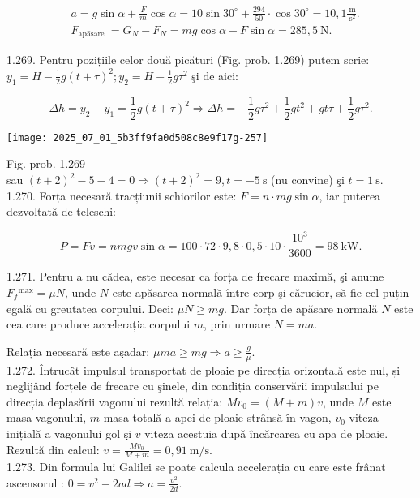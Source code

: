 $$
\begin{aligned}
& a=g \sin \alpha+\frac{F}{m} \cos \alpha=10 \sin 30^{\circ}+\frac{294}{50} \cdot \cos 30^{\circ}=10,1 \frac{\mathrm{~m}}{\mathrm{~s}^{2}} . \\
& F_{\text {apāsare }}=G_{N}-F_{N}=m g \cos \alpha-F \sin \alpha=285,5 \mathrm{~N} .
\end{aligned}
$$

1.269. Pentru pozițiile celor două picături (Fig. prob. 1.269) putem scrie: $y_{1}=H-\frac{1}{2} g(t+\tau)^{2} ; y_{2}=H-\frac{1}{2} g \tau^{2}$ şi de aici:

$$
\Delta h=y_{2}-y_{1}=\frac{1}{2} g(t+\tau)^{2} \Rightarrow \Delta h=-\frac{1}{2} g \tau^{2}+\frac{1}{2} g t^{2}+g t \tau+\frac{1}{2} g \tau^{2} .
$$

\begin{center}
\texttt{[image: 2025\_07\_01\_5b3ff9fa0d508c8e9f17g-257]}
\end{center}

Fig. prob. 1.269\\
sau $(t+2)^{2}-5-4=0 \Rightarrow(t+2)^{2}=9, t=-5 \mathrm{~s}$ (nu convine) şi $t=1 \mathrm{~s}$.\\
1.270. Forța necesară tracțiunii schiorilor este: $F=n \cdot m g \sin \alpha$, iar puterea dezvoltată de teleschi:

$$
P=F v=n m g v \sin \alpha=100 \cdot 72 \cdot 9,8 \cdot 0,5 \cdot 10 \cdot \frac{10^{3}}{3600}=98 \mathrm{~kW} .
$$

1.271. Pentru a nu cădea, este necesar ca forța de frecare maximă, şi anume $F_{f}{ }^{\max }=\mu N$, unde $N$ este apăsarea normală între corp şi cărucior, să fie cel puțin egală cu greutatea corpului. Deci: $\mu N \geq m g$. Dar forța de apăsare normală $N$ este cea care produce accelerația corpului $m$, prin urmare $N=m a$.

Relația necesară este aşadar: $\mu m a \geq m g \Rightarrow a \geq \frac{g}{\mu}$.\\
1.272. Întrucât impulsul transportat de ploaie pe direcția orizontală este nul, și neglijând forțele de frecare cu şinele, din condiția conservării impulsului pe direcția deplasării vagonului rezultă relația: $M v_{0}=(M+m) v$, unde $M$ este masa vagonului, $m$ masa totală a apei de ploaie strânsă în vagon, $v_{0}$ viteza inițială a vagonului gol şi $v$ viteza acestuia după încărcarea cu apa de ploaie. Rezultă din calcul: $v=\frac{M v_{0}}{M+m}=0,91 \mathrm{~m} / \mathrm{s}$.\\
1.273. Din formula lui Galilei se poate calcula accelerația cu care este frânat ascensorul : $0=v^{2}-2 a d \Rightarrow a=\frac{v^{2}}{2 d}$.

